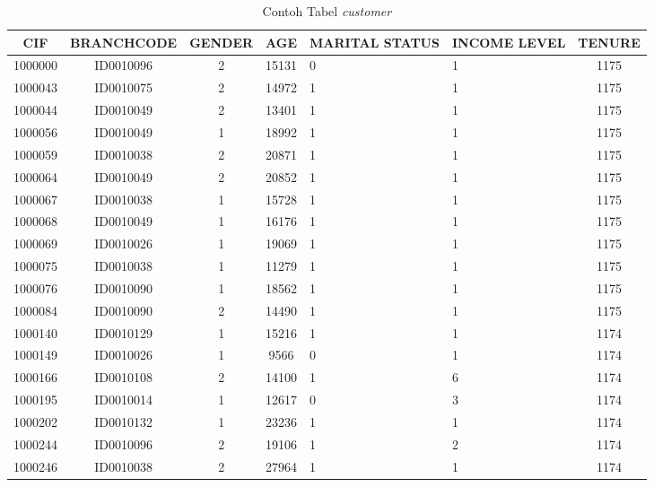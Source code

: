	\begin{table}[H]
	\centering
		\caption{Contoh Tabel \textit{customer}}
		\begin{tabular}{ | c | c| c | c | p{2cm} | p{2cm} | c |}
			\hline
				CIF & BRANCHCODE & GENDER & AGE & MARITAL STATUS & INCOME LEVEL & TENURE \\ \hline \hline
			1000000&ID0010096&2&15131&0&1&1175 \\ \hline 
			1000043&ID0010075&2&14972&1&1&1175 \\ \hline
			1000044&ID0010049&2&13401&1&1&1175 \\ \hline
			1000056&ID0010049&1&18992&1&1&1175 \\ \hline
			1000059&ID0010038&2&20871&1&1&1175 \\ \hline
			1000064&ID0010049&2&20852&1&1&1175 \\ \hline
			1000067&ID0010038&1&15728&1&1&1175 \\ \hline
			1000068&ID0010049&1&16176&1&1&1175 \\ \hline
			1000069&ID0010026&1&19069&1&1&1175 \\ \hline
			1000075&ID0010038&1&11279&1&1&1175 \\ \hline
			1000076&ID0010090&1&18562&1&1&1175 \\ \hline
			1000084&ID0010090&2&14490&1&1&1175 \\ \hline
			1000140&ID0010129&1&15216&1&1&1174 \\ \hline
			1000149&ID0010026&1&9566&0&1&1174 \\ \hline
			1000166&ID0010108&2&14100&1&6&1174 \\ \hline
			1000195&ID0010014&1&12617&0&3&1174 \\ \hline
			1000202&ID0010132&1&23236&1&1&1174 \\ \hline
			1000244&ID0010096&2&19106&1&2&1174 \\ \hline
			1000246&ID0010038&2&27964&1&1&1174 \\ \hline
		\end{tabular}
\end{table}

